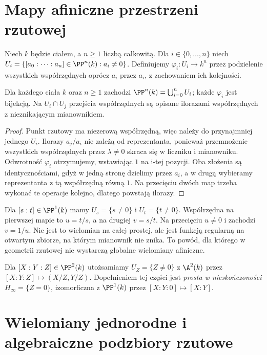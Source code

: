 \section{Mapy afiniczne przestrzeni rzutowej}

\begin{definicja}
Niech $k$ będzie ciałem, a $n\ge1$ liczbą całkowitą.
Dla $i\in\{0,\ldots,n\}$ niech
$U_i=\{[a_0:\cdots:a_n]\in\PP^n(k):a_i\ne0\}$.
Definiujemy $\varphi_i:U_i\to k^n$ przez podzielenie
wszystkich współrzędnych oprócz $a_i$ przez $a_i$,
z zachowaniem ich kolejności.
\end{definicja}

\begin{stwierdzenie}
Dla każdego ciała $k$ oraz $n\ge1$ zachodzi
$\PP^n(k)=\bigcup_{i=0}^n U_i$; każde $\varphi_i$
jest bijekcją. Na $U_i\cap U_j$ przejścia współrzędnych
są opisane ilorazami współrzędnych z nieznikającym mianownikiem.
\end{stwierdzenie}
\begin{proof}
Punkt rzutowy ma niezerową współrzędną, więc należy do
przynajmniej jednego $U_i$. Ilorazy $a_j/a_i$ nie zależą
od reprezentanta, ponieważ przemnożenie wszystkich współrzędnych
przez $\lambda\ne0$ skraca się w liczniku i mianowniku.
Odwrotność $\varphi_i$ otrzymujemy, wstawiając $1$ na
i-tej pozycji. Oba złożenia są identycznościami, gdyż w jedną
stronę dzielimy przez $a_i$, a w drugą wybieramy reprezentanta
z tą współrzędną równą $1$. Na przecięciu dwóch map trzeba
wykonać te operacje kolejno, dlatego powstają ilorazy.
\end{proof}

\begin{przyklad}
Dla $[s:t]\in\PP^1(k)$ mamy $U_s=\{s\ne0\}$ i
$U_t=\{t\ne0\}$. Współrzędna na pierwszej mapie to
$u=t/s$, a na drugiej $v=s/t$. Na przecięciu $u\ne0$
i zachodzi $v=1/u$. Nie jest to wielomian na całej prostej,
ale jest funkcją regularną na otwartym zbiorze, na którym
mianownik nie znika. To powód, dla którego w geometrii
rzutowej nie wystarczą globalne wielomiany afiniczne.
\end{przyklad}

Dla $[X:Y:Z]\in\PP^2(k)$ utożsamiamy
$U_Z=\{Z\ne0\}$ z $\A^2(k)$ przez
$[X:Y:Z]\mapsto(X/Z,Y/Z)$. Dopełnieniem tej części
jest \emph{prosta w nieskończoności} $H_\infty=\{Z=0\}$,
izomorficzna z $\PP^1(k)$ przez $[X:Y:0]\mapsto[X:Y]$.

\section{Wielomiany jednorodne i algebraiczne podzbiory rzutowe}

